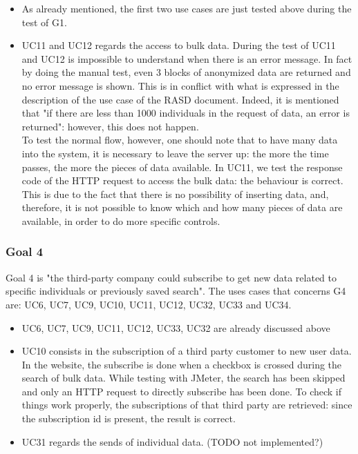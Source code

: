 \begin{itemize}
\item 
As already mentioned, the first two use cases are just tested above during the test of G1.

\item 
UC11 and UC12 regards the access to bulk data.
During the test of UC11 and UC12 is impossible to understand when there is an error message. 
In fact by doing the manual test, even 3 blocks of anonymized data are returned and no error message is shown. 
This is in conflict with what is expressed in the description of the use case of the RASD document. 
Indeed, it is mentioned that "if there are less than 1000 individuals in the request of data, an error is returned":
however, this does not happen. \\
To test the normal flow, however, one should note that to have many data into the system, it is necessary to leave the server up: the more the
time passes, the more the pieces of data available. In UC11, we test the response code of the HTTP request to access the bulk data: the
behaviour is correct. This is due to the fact that there is no possibility of inserting data, and, therefore, it is not possible to know which
and how many pieces of data are available, in order to do more specific controls. 

\end{itemize}

\subsubsection{Goal 4}
Goal 4 is "the third-party company could subscribe to get new data related to specific
individuals or previously saved search".
The uses cases that concerns G4 are: UC6, UC7, UC9, UC10, UC11, UC12, UC32, UC33 and UC34. \\

\begin{itemize}
\item 
UC6, UC7, UC9, UC11, UC12, UC33, UC32 are already discussed above

\item 
UC10 consists in the subscription of a third party customer to new user data. \\
In the website, the subscribe is done when a checkbox is crossed during the search of bulk data. 
While testing with JMeter, the search has been skipped and only an HTTP request to directly subscribe has been done.
To check if things work properly, the subscriptions of that third party are retrieved: since the subscription id is present, the
result is correct.

\item UC31 regards the sends of individual data. 
(TODO not implemented?)

\end{itemize}

